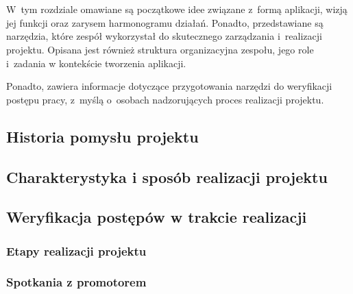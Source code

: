 \chapter{\ChapterTitleWorkOrganization}
\label{sec:organizacja-pracy}

W~tym rozdziale omawiane są początkowe idee związane z~formą aplikacji,
wizją jej funkcji oraz zarysem harmonogramu działań. Ponadto, przedstawiane
są narzędzia, które zespół wykorzystał do skutecznego zarządzania
i~realizacji projektu. Opisana jest również struktura organizacyjna
zespołu, jego role i~zadania w kontekście tworzenia aplikacji.

Ponadto, zawiera informacje dotyczące przygotowania narzędzi do
weryfikacji postępu pracy, z~myślą o~osobach nadzorujących proces
realizacji projektu.

\section{Historia pomysłu projektu}


\section{Charakterystyka i sposób realizacji projektu}


\section{Weryfikacja postępów w trakcie realizacji}

\subsection{Etapy realizacji projektu}

\subsection{Spotkania z promotorem}

